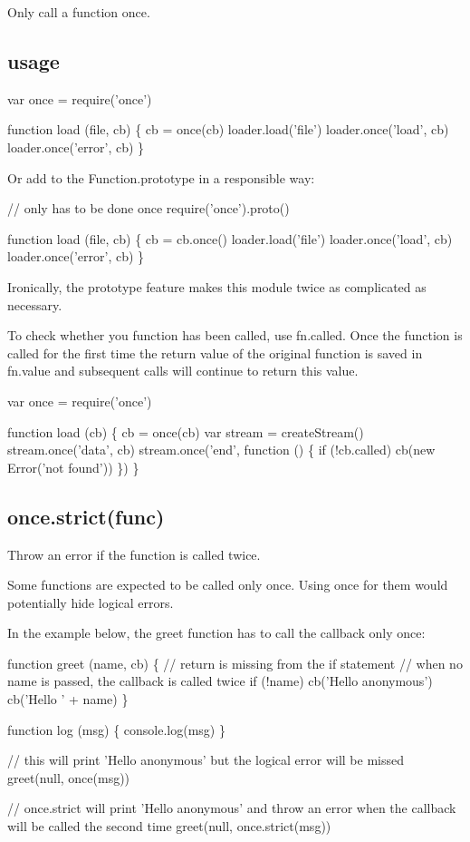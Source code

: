 Only call a function once.

\subsection*{usage}


\begin{DoxyCode}
var once = require('once')

function load (file, cb) \{
  cb = once(cb)
  loader.load('file')
  loader.once('load', cb)
  loader.once('error', cb)
\}
\end{DoxyCode}


Or add to the Function.\+prototype in a responsible way\+:


\begin{DoxyCode}
// only has to be done once
require('once').proto()

function load (file, cb) \{
  cb = cb.once()
  loader.load('file')
  loader.once('load', cb)
  loader.once('error', cb)
\}
\end{DoxyCode}


Ironically, the prototype feature makes this module twice as complicated as necessary.

To check whether you function has been called, use {\ttfamily fn.\+called}. Once the function is called for the first time the return value of the original function is saved in {\ttfamily fn.\+value} and subsequent calls will continue to return this value.


\begin{DoxyCode}
var once = require('once')

function load (cb) \{
  cb = once(cb)
  var stream = createStream()
  stream.once('data', cb)
  stream.once('end', function () \{
    if (!cb.called) cb(new Error('not found'))
  \})
\}
\end{DoxyCode}


\subsection*{{\ttfamily once.\+strict(func)}}

Throw an error if the function is called twice.

Some functions are expected to be called only once. Using {\ttfamily once} for them would potentially hide logical errors.

In the example below, the {\ttfamily greet} function has to call the callback only once\+:


\begin{DoxyCode}
function greet (name, cb) \{
  // return is missing from the if statement
  // when no name is passed, the callback is called twice
  if (!name) cb('Hello anonymous')
  cb('Hello ' + name)
\}

function log (msg) \{
  console.log(msg)
\}

// this will print 'Hello anonymous' but the logical error will be missed
greet(null, once(msg))

// once.strict will print 'Hello anonymous' and throw an error when the callback will be called the second
       time
greet(null, once.strict(msg))
\end{DoxyCode}
 